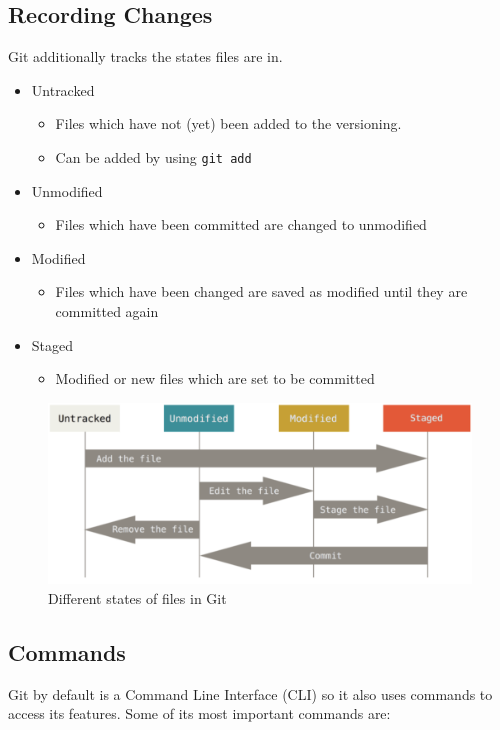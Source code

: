 \documentclass{article}
\begin{document}
	\subsection{Recording Changes}
	Git additionally tracks the states files are in.
	\begin{itemize}
		\item{Untracked}
		\begin{itemize}
			\item{Files which have not (yet) been added to the versioning.}
			\item{Can be added by using \texttt{git add}}
		\end{itemize}
		\item{Unmodified}
		\begin{itemize}
			\item{Files which have been committed are changed to unmodified}
		\end{itemize}
		\item{Modified}
		\begin{itemize}
			\item{Files which have been changed are saved as modified until they are committed again}
		\end{itemize}
		\item{Staged}
		\begin{itemize}
			\item{Modified or new files which are set to be committed}
		\end{itemize}
	\end{itemize}
	\begin{figure}[H]
	\centering
	\includegraphics[scale=0.4]{Bilder/git_states.png}
	\caption{Different states of files in Git}
	\end{figure}
	
	\subsection{Commands}
	Git by default is a Command Line Interface (CLI) so it also uses commands to access its features. Some of its most important commands are:
\end{document}
